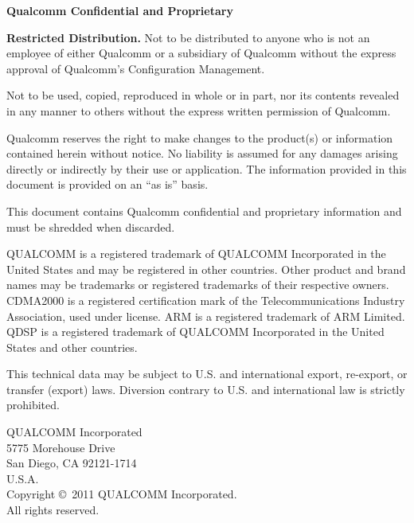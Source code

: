 \vspace*{0.1pt}
\begin{center}
\bf\large Qualcomm Confidential and Proprietary
\end{center}
\vspace*{-0.1pt}
\begin{justifying}
\setlength{\parskip}{2ex plus 1ex minus 2ex}
\small \textbf{Restricted Distribution.} \small Not to be distributed to anyone who is not an employee of either Qualcomm or a subsidiary of Qualcomm without the express approval of Qualcomm's Configuration Management.

\noindent Not to be used, copied, reproduced in whole or in part, nor its contents revealed in any manner to others without the express written permission of Qualcomm.

\noindent Qualcomm reserves the right to make changes to the product(s) or information contained herein without notice. No liability is assumed for any damages arising directly or indirectly by their use or application. The information provided in this document is provided on an ``as is'' basis.

\noindent This document contains Qualcomm confidential and proprietary information and must be shredded when discarded.

\noindent QUALCOMM is a registered trademark of QUALCOMM Incorporated in the United States and may be registered in other countries. Other product and brand names may be trademarks or registered trademarks of their respective owners. CDMA2000 is a registered certification mark of the Telecommunications Industry Association, used under license. ARM is a registered trademark of ARM Limited. QDSP is a registered trademark of QUALCOMM Incorporated in the United States and other countries.

\noindent This technical data may be subject to U.S. and international export, re-export, or transfer (export) laws. Diversion contrary to U.S. and international law is strictly prohibited.
\end{justifying}
\vspace{-0.04pt}
\bf\begin {center}
QUALCOMM Incorporated \\
5775 Morehouse Drive \\
San Diego, CA 92121-1714 \\
U.S.A. \\
\vspace{0.01pt}
Copyright \copyright \ 2011 QUALCOMM Incorporated. \\
All rights reserved. \\
\end{center}


